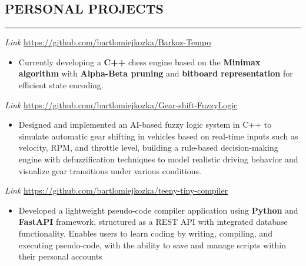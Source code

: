 \documentclass[9pt]{extarticle}
\begin{document}
\subsection*{PERSONAL PROJECTS}
\vspace{-1.5em}
\rule{\textwidth}{0.1pt}
\vspace{-0.5em}

\noindent
{}
\textit{Link}
\href{https://github.com/bartlomiejkozka/Barkoz-Tempo}{https://github.com/bartlomiejkozka/Barkoz-Tempo}
\begin{itemize}[itemsep=-3pt, topsep=3pt]
    \item Currently developing a \textbf{C++} chess engine based on the \textbf{Minimax algorithm} with \textbf{Alpha-Beta pruning} and \textbf{bitboard representation} for efficient state encoding.
\end{itemize}

\noindent
{}
\textit{Link}
\href{https://github.com/bartlomiejkozka/Gear-shift-FuzzyLogic}{https://github.com/bartlomiejkozka/Gear-shift-FuzzyLogic}
\begin{itemize}[itemsep=-3pt, topsep=3pt]
    \item Designed and implemented an AI-based fuzzy logic system in C++ to simulate automatic gear shifting in vehicles based on real-time inputs such as velocity, RPM, and throttle level, building a rule-based decision-making engine with defuzzification techniques to model realistic driving behavior and visualize gear transitions under various conditions.
\end{itemize}

\noindent
{}
\textit{Link}
\href{https://github.com/bartlomiejkozka/teeny-tiny-compiler}{https://github.com/bartlomiejkozka/teeny-tiny-compiler}
\begin{itemize}[itemsep=-3pt, topsep=3pt]
    \item Developed a lightweight pseudo-code compiler application using \textbf{Python} and \textbf{FastAPI}
          framework, structured as a REST API with integrated database functionality.
          Enables users to learn coding by writing, compiling, and executing pseudo-code, with the
          ability to save and manage scripts within their personal accounts
\end{itemize}
\end{document}
